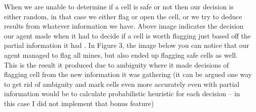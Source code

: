 \documentclass{article}
\begin{document}
When we are unable to determine if a cell is safe or not then our decision is either random, in that case we either flag or open the cell, or we try to deduce results from whatever information we have. Above image indicates the decision our agent made when it had to decide if a cell is worth flagging just based off the partial information it had . 
In Figure 3, the image below you can notice that our agent managed to flag all mines, but also ended up flagging safe cells as well. This is the result it produced due to ambiguity  where it made decisions of flagging cell from the new information it was gathering (it can be argued one way to get rid of ambiguity and mark cells even more accurately even with partial information would be to calculate probabilistic heuristic for each decision – in this case I did not implement that bonus feature)

\\\\
\end{document}
